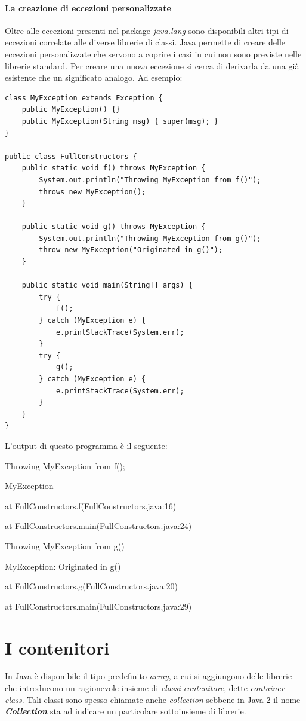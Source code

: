\documentclass[12pt]{report}
\begin{document}
\paragraph{La creazione di eccezioni personalizzate} Oltre alle eccezioni presenti nel package \textit{java.lang} sono disponibili altri tipi di eccezioni correlate alle diverse librerie di classi. Java permette di creare delle eccezioni personalizzate che servono a coprire i casi in cui non sono previste nelle librerie standard. Per creare una nuova eccezione si cerca di derivarla da una già esistente che un significato analogo. Ad esempio:
\begin{lstlisting}[style=javastyle]
class MyException extends Exception {
	public MyException() {}
	public MyException(String msg) { super(msg); }
}

public class FullConstructors {
	public static void f() throws MyException {
		System.out.println("Throwing MyException from f()");
		throws new MyException();
	}

	public static void g() throws MyException {
		System.out.println("Throwing MyException from g()");
		throw new MyException("Originated in g()");
	}

	public static void main(String[] args) {
		try {
			f();
		} catch (MyException e) {
			e.printStackTrace(System.err);
		}
		try {
			g();
		} catch (MyException e) {
			e.printStackTrace(System.err);
		}
	}
}
\end{lstlisting}
L'output di questo programma è il seguente:
\begin{center}
	Throwing MyException from f();

	MyException

	at FullConstructors.f(FullConstructors.java:16)

	at FullConstructors.main(FullConstructors.java:24)

	Throwing MyException from g()

	MyException: Originated in g()

	at FullConstructors.g(FullConstructors.java:20)

	at FullConstructors.main(FullConstructors.java:29)
\end{center}
\section{I contenitori}
In Java è disponibile il tipo predefinito \textit{array}, a cui si aggiungono delle librerie che introducono un ragionevole insieme di \textit{classi contenitore}, dette \textit{container class}. Tali classi sono spesso chiamate anche \textit{collection} sebbene in Java 2 il nome \textbf{\textit{Collection}} sta ad indicare un particolare sottoinsieme di librerie.
\end{document}
